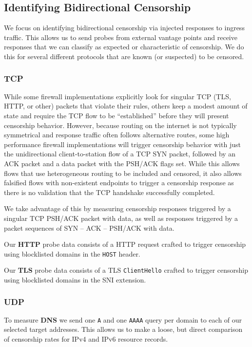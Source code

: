 \subsection{Identifying Bidirectional Censorship}
\label{sec:methodology:censorship}

We focus on identifying bidirectional censorship via injected responses to
ingress traffic. This allows us to send probes from external vantage points and
receive responses that we can classify as expected or characteristic of
censorship. We do this for several different protocols that are known (or
suspected) to be censored.



\FigProbeSend

\subsubsection{TCP}
While some firewall implementations explicitly look for singular TCP (TLS, HTTP,
or other) packets that violate their rules, others keep a modest amount of state
and require the TCP flow to be ``established'' before they will present
censorship behavior. However, because routing on the internet is not typically
symmetrical and response traffic often follows alternative routes, some high
performance firewall implementations will trigger censorship behavior with just
the unidirectional client-to-station flow of a TCP SYN packet, followed by an
ACK packet and a data packet with the PSH/ACK flags set. While this allows flows
that use heterogeneous routing to be included and censored, it also allows
falsified flows with non-existent endpoints to trigger a censorship response as
there is no validation that the TCP handshake successfully completed.

We take advantage of this by measuring censorship responses triggered by a
singular TCP PSH/ACK packet with data, as well as responses triggered by a
packet sequences of SYN -- ACK -- PSH/ACK with data.

Our \textbf{HTTP} probe data consists of a HTTP request crafted to trigger
censorship using blocklisted domains in the \texttt{HOST} header.

Our \textbf{TLS} probe data consists of a TLS \texttt{ClientHello} crafted to
trigger censorship using blocklisted domains in the SNI extension.

\subsubsection{UDP}
To measure \textbf{DNS} we send one {\tt A} and one {\tt AAAA} query per domain
to each of our selected target addresses. This allows us to make a loose, but
direct comparison of censorship rates for IPv4 and IPv6 resource records.


